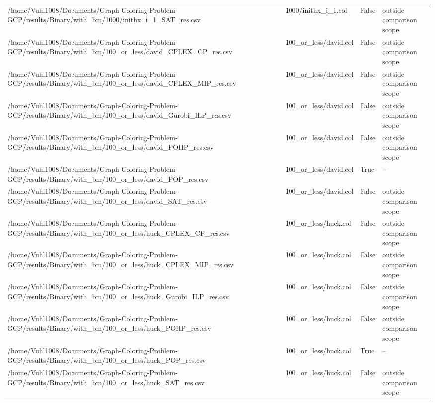 \begin{table}[htbp]
\begin{tabular}{llll}
/home/Vuhl1008/Documents/Graph-Coloring-Problem-GCP/results/Binary/with\_bm/1000/inithx\_i\_1\_SAT\_res.csv & 1000/inithx\_i\_1.col & False & outside comparison scope \\
/home/Vuhl1008/Documents/Graph-Coloring-Problem-GCP/results/Binary/with\_bm/100\_or\_less/david\_CPLEX\_CP\_res.csv & 100\_or\_less/david.col & False & outside comparison scope \\
/home/Vuhl1008/Documents/Graph-Coloring-Problem-GCP/results/Binary/with\_bm/100\_or\_less/david\_CPLEX\_MIP\_res.csv & 100\_or\_less/david.col & False & outside comparison scope \\
/home/Vuhl1008/Documents/Graph-Coloring-Problem-GCP/results/Binary/with\_bm/100\_or\_less/david\_Gurobi\_ILP\_res.csv & 100\_or\_less/david.col & False & outside comparison scope \\
/home/Vuhl1008/Documents/Graph-Coloring-Problem-GCP/results/Binary/with\_bm/100\_or\_less/david\_POHP\_res.csv & 100\_or\_less/david.col & False & outside comparison scope \\
/home/Vuhl1008/Documents/Graph-Coloring-Problem-GCP/results/Binary/with\_bm/100\_or\_less/david\_POP\_res.csv & 100\_or\_less/david.col & True & -- \\
/home/Vuhl1008/Documents/Graph-Coloring-Problem-GCP/results/Binary/with\_bm/100\_or\_less/david\_SAT\_res.csv & 100\_or\_less/david.col & False & outside comparison scope \\
/home/Vuhl1008/Documents/Graph-Coloring-Problem-GCP/results/Binary/with\_bm/100\_or\_less/huck\_CPLEX\_CP\_res.csv & 100\_or\_less/huck.col & False & outside comparison scope \\
/home/Vuhl1008/Documents/Graph-Coloring-Problem-GCP/results/Binary/with\_bm/100\_or\_less/huck\_CPLEX\_MIP\_res.csv & 100\_or\_less/huck.col & False & outside comparison scope \\
/home/Vuhl1008/Documents/Graph-Coloring-Problem-GCP/results/Binary/with\_bm/100\_or\_less/huck\_Gurobi\_ILP\_res.csv & 100\_or\_less/huck.col & False & outside comparison scope \\
/home/Vuhl1008/Documents/Graph-Coloring-Problem-GCP/results/Binary/with\_bm/100\_or\_less/huck\_POHP\_res.csv & 100\_or\_less/huck.col & False & outside comparison scope \\
/home/Vuhl1008/Documents/Graph-Coloring-Problem-GCP/results/Binary/with\_bm/100\_or\_less/huck\_POP\_res.csv & 100\_or\_less/huck.col & True & -- \\
/home/Vuhl1008/Documents/Graph-Coloring-Problem-GCP/results/Binary/with\_bm/100\_or\_less/huck\_SAT\_res.csv & 100\_or\_less/huck.col & False & outside comparison scope \\

\end{tabular}
\end{table}
